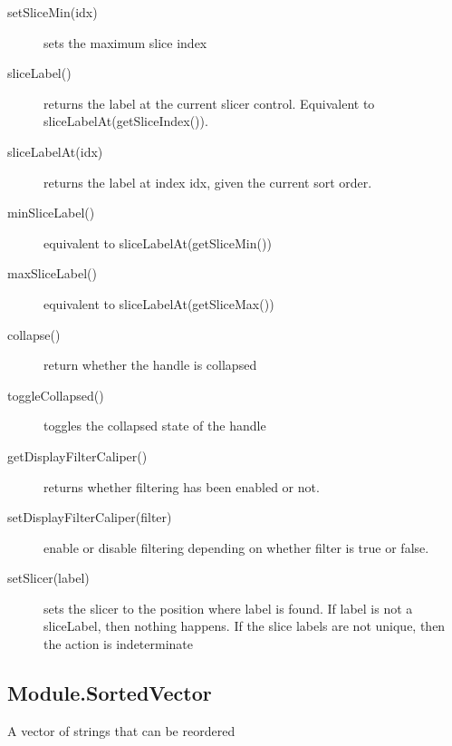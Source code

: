 \documentclass{article}
\begin{document}
\begin{description}
\begin{description}
\item[setSliceMin(idx)] sets the maximum slice index
\item[sliceLabel()] returns the label at the current slicer
  control. Equivalent to sliceLabelAt(getSliceIndex()).
\item[sliceLabelAt(idx)] returns the label at index idx, given the
  current sort order.
\item[minSliceLabel()] equivalent to sliceLabelAt(getSliceMin())
\item[maxSliceLabel()] equivalent to sliceLabelAt(getSliceMax())
\item[collapse()] return whether the handle is collapsed
\item[toggleCollapsed()] toggles the collapsed state of the handle
\item[getDisplayFilterCaliper()] returns whether filtering has been
  enabled or not.
\item[setDisplayFilterCaliper(filter)] enable or disable filtering
  depending on whether filter is true or false.
\item[setSlicer(label)] sets the slicer to the position where label is
  found. If label is not a sliceLabel, then nothing happens. If the
  slice labels are not unique, then the action is indeterminate
  \end{description}
\end{description}

\subsection{Module.SortedVector}

A vector of strings that can be reordered
\end{document}
